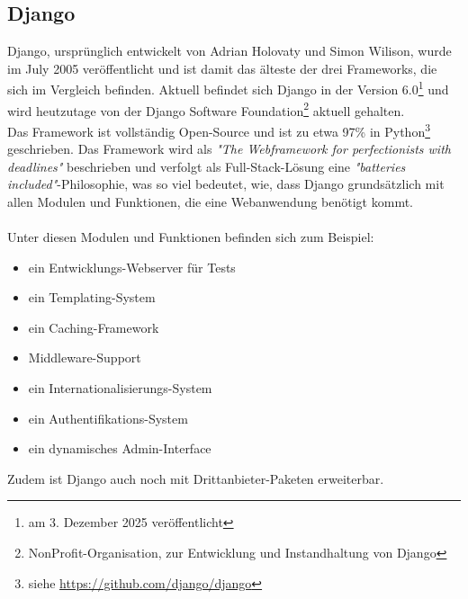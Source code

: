 \documentclass[letterpaper,11pt,leqno]{article}
\begin{document}
\subsection{Django}
Django, ursprünglich entwickelt von Adrian Holovaty und Simon Wilison, wurde im July 2005 veröffentlicht und ist damit das älteste
der drei Frameworks, die sich im Vergleich befinden. Aktuell befindet sich Django in der Version 6.0\footnote{am 3. Dezember 2025
veröffentlicht} und wird heutzutage von der Django Software Foundation\footnote{NonProfit-Organisation, zur Entwicklung und
Instandhaltung von Django} aktuell gehalten.\\Das Framework ist vollständig Open-Source und ist zu etwa 97\% in Python\footnote{
siehe \url{https://github.com/django/django}} geschrieben. Das Framework wird als \textit{"The Webframework for perfectionists
with deadlines"} beschrieben und verfolgt als Full-Stack-Lösung eine \textit{"batteries included"}-Philosophie, was so viel
bedeutet, wie, dass Django grundsätzlich mit allen Modulen und Funktionen, die eine Webanwendung benötigt kommt.\\\\ Unter diesen
Modulen und Funktionen befinden sich zum Beispiel:
\begin{itemize}
	\item ein Entwicklungs-Webserver für Tests
	\item ein Templating-System
	\item ein Caching-Framework
	\item Middleware-Support
	\item ein Internationalisierungs-System
	\item ein Authentifikations-System
	\item ein dynamisches Admin-Interface
\end{itemize}
Zudem ist Django auch noch mit Drittanbieter-Paketen erweiterbar.
\end{document}
